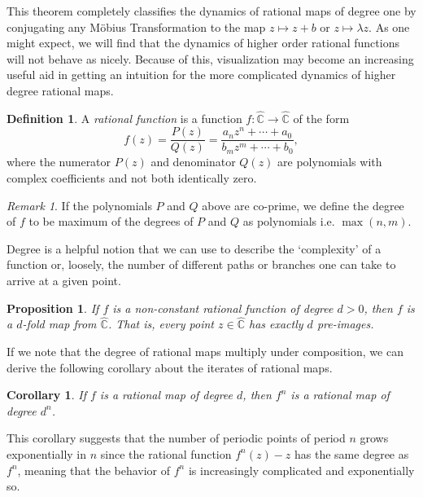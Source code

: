\documentclass{amsart}
\newcommand{\bbC}{\mathbb{C}}
\newcommand{\bbCS}{\hat{\bbC}}
\newtheorem{cor}[thm]{Corollary}
\newtheorem{prop}[thm]{Proposition}
\theoremstyle{definition}
\newtheorem{defn}[thm]{Definition}
\theoremstyle{remark}
\newtheorem{rem}[thm]{Remark}
\numberwithin{equation}{section}
\begin{document}
 This theorem completely classifies the dynamics of rational maps of degree one by conjugating any M\"obius Transformation to the map $z\mapsto z+b$ or $z\mapsto \lambda z$.  As one might expect, we will find that the dynamics of higher order rational functions will not behave as nicely. Because of this, visualization may become an increasing useful aid in getting an intuition for the more complicated dynamics of higher degree rational maps.

  \begin{defn}
    A \emph{rational function} is a function $f:\bbCS\to\bbCS$ of the form
    \begin{equation}
      f(z)=\frac{P(z)}{Q(z)}=\frac{a_nz^n+\dotsb+ a_0}{b_mz^m+\dotsb+ b_0},
    \end{equation}
    where the numerator $P(z)$ and denominator $Q(z)$ are polynomials with complex coefficients and not both identically zero.
  \end{defn}
  \begin{rem}
    If the polynomials $P$ and $Q$ above are co-prime, we define the degree of $f$ to be maximum of the degrees of $P$ and $Q$ as polynomials i.e. $\max(n,m).$
\end{rem}

Degree is a helpful notion that we can use to describe the `complexity' of a function or, loosely, the number of different paths or branches one can take to arrive at a given point.

  \begin{prop}
    If $f$ is a non-constant rational function of degree $d>0$, then $f$ is a $d$-fold map from $\bbCS$. That is, every point $z\in\bbCS$ has exactly $d$ pre-images.
  \end{prop}


If we note that the degree of rational maps multiply under composition, we can derive the following corollary about the iterates of rational maps.

\begin{cor}\label{ExpDeg}
  If $f$ is a rational map of degree $d$, then $f^n$ is a rational map of degree $d^n$.
\end{cor}
This corollary suggests that the number of periodic points of period $n$ grows exponentially in $n$ since the rational function $f^n(z)-z$ has the same degree as $f^n$, meaning that the behavior of $f^n$ is increasingly complicated and exponentially so.
\end{document}
